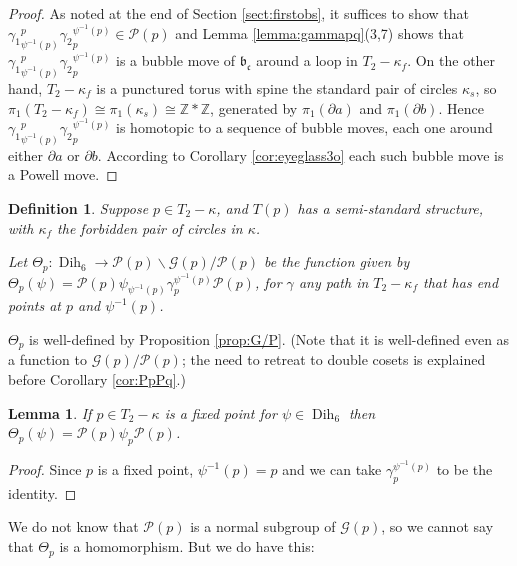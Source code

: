 \documentclass[12pt]{amsart}
\newtheorem{defin}[thm]{Definition}
\newtheorem{lemma}[thm]{Lemma}
\newcommand{\calG}{\mathcal G}
\newcommand{\calP}{\mathcal P}
\newcommand{\bs}{\backslash}
\newcommand{\bdd}{\mbox{$\partial$}}
\newcommand{\Dih}{\operatorname{Dih}}
\def\zed{{\mathbb Z}}
\newcommand{\frb}{\mathfrak{b}}
\newcommand{\frc}{\mbox{$\mathfrak{c}$}}
\begin{document}
\begin{proof} As noted at the end of Section \ref{sect:firstobs},
it suffices to show that ${\gamma_1}^p_{\psi^{-1}(p)} {\gamma_2}_p^{\psi^{-1}(p)} \in \calP(p)$ and  
Lemma \ref{lemma:gammapq}(3,7) shows that ${\gamma_1}^p_{\psi^{-1}(p)} {\gamma_2}_p^{\psi^{-1}(p)}$ is a bubble move of $\frb_{\frc}$ around a loop in $T_2 - \kappa_f$.  On the other hand, $T_2 - \kappa_f$ is a punctured torus with spine the standard pair of circles $\kappa_s$, so $\pi_1(T_2 - \kappa_f) \cong \pi_1(\kappa_s) \cong \zed * \zed$, generated by $\pi_1(\bdd a)$ and $\pi_1(\bdd b)$.  Hence ${\gamma_1}^p_{\psi^{-1}(p)} {\gamma_2}_p^{\psi^{-1}(p)}$ is homotopic to a sequence of bubble moves, each one around either $\bdd a$ or $\bdd b$.  According to Corollary \ref{cor:eyeglass3o} each such bubble move is a Powell move.
\end{proof}

\begin{defin} \label{defin:thetap}  Suppose $p \in T_2 - \kappa$, and $T(p)$ has a semi-standard structure, with $\kappa_f$ the forbidden pair of circles in $\kappa$. 

Let $\Theta_p: \Dih_6 \to \calP(p) \bs\calG(p)/\calP(p)$ be the function given by $\Theta_p(\psi) = \calP(p) \psi_{\psi^{-1}(p)} {\gamma}_p^{\psi^{-1}(p)} \calP(p)$, for $\gamma$ any path in $T_2 - \kappa_f$ that has end points at $p$ and $\psi^{-1}(p)$.  
\end{defin}

$\Theta_p$ is well-defined by Proposition \ref{prop:G/P}.  (Note that it is well-defined even as a function to $\calG(p)/\calP(p)$; the need to retreat to double cosets is explained before Corollary \ref{cor:PpPq}.)

\begin{lemma} \label{lemma:fixedp} If $p \in T_2 - \kappa$ is a fixed point for $\psi \in \Dih_6$ then $\Theta_p(\psi) = \calP(p) \psi_p  \calP(p)$.
\end{lemma}

\begin{proof}  Since $p$ is a fixed point, $\psi^{-1}(p) = p$ and we can take ${\gamma}_p^{\psi^{-1}(p)}$ to be the identity.  
\end{proof}

We do not know that $\calP(p)$ is a normal subgroup of $\calG(p)$, so we cannot say that $\Theta_p$ is a homomorphism.  But we do have this:
\end{document}
